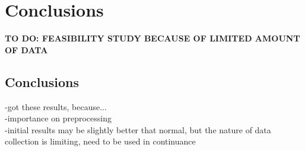 
\section{Conclusions}\label{sec:conclusion}







\textbf{TO DO: FEASIBILITY STUDY BECAUSE OF LIMITED AMOUNT OF DATA}

\subsection{Conclusions}
-got these results, because...\\
-importance on preprocessing\\
-initial results may be slightly better that normal, but the nature of data collection is limiting, need to be used in continuance\\ 

